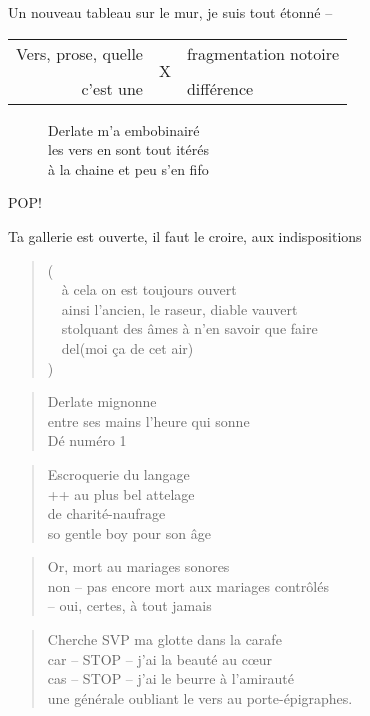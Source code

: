   \begin{center}
    Un nouveau tableau sur le mur, je suis tout étonné --
  \end{center}
  \begin{table}[h]
    \centering
    \begin{tabular}{rcl}
      Vers, prose, quelle & \multirow{3}{*}{\Huge{X}} & fragmentation notoire \\
			  &                           & \\
      c’est une           &                           & différence
    \end{tabular}
  \end{table}
  \begin{figure}[h]
    \centering
      Derlate m’a embobinairé\\
      les vers en sont tout itérés\\
      à la chaine et peu s’en fifo
  \end{figure}
  \begin{center}
    \textsc{POP!}
  \end{center}
  Ta gallerie est ouverte, il faut le croire, aux indispositions
  \begin{verse}
    (\\
    ~~à cela on est toujours ouvert\\
    ~~ainsi l’ancien, le raseur, diable vauvert\\
    ~~stolquant des âmes à n’en savoir que faire\\
    ~~del(moi ça de cet air)\\
    )
  \end{verse}

  \begin{verse}
    Derlate mignonne\\
    entre ses mains l’heure qui sonne\\
    Dé numéro 1
  \end{verse}
  \begin{verse}
    Escroquerie du langage\\
    ++ au plus bel attelage\\
    de charité-naufrage\\
    so gentle boy pour son âge
  \end{verse}
  \begin{verse}
    Or, mort au mariages sonores\\
    non -- pas encore mort aux mariages contrôlés\\
    -- oui, certes, à tout jamais
  \end{verse}
  \begin{verse}
    Cherche SVP ma glotte dans la carafe\\
    car -- STOP -- j’ai la beauté au cœur\\
    cas -- STOP -- j’ai le beurre à l’amirauté\\
    une générale oubliant le vers au porte-épigraphes.
  \end{verse}

